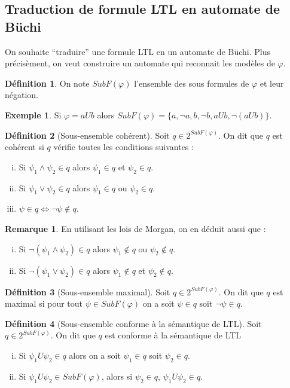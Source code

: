 \documentclass[12pt,a4paper]{article}
\theoremstyle{plain}
\theoremstyle{definition}
\newtheorem{defi}{Définition}
\newtheorem{rmq}{Remarque}
\newtheorem{ex}{Exemple}
\begin{document}
\subsection{Traduction de formule LTL en automate de Büchi}
On souhaite ``traduire'' une formule LTL en un automate de Büchi. Plus précisèment, on veut construire un automate qui reconnait les modèles de $\varphi$.

\begin{defi}
  On note $SubF(\varphi)$ l'ensemble des sous formules de $\varphi$ et leur négation.  
\end{defi}

\begin{ex}
  Si $\varphi = a U b$ alors $SubF(\varphi) = \{ a, \lnot a, b, \lnot b, a U b, \lnot(a U b)\}$.
\end{ex}

\begin{defi}[Sous-ensemble cohérent]
  Soit $q \in 2^{SubF(\varphi)}$. On dit que $q$ est cohérent si $q$ vérifie toutes les conditions suivantes :
  \begin{enumerate}[(i)]
  \item Si $\psi_1 \land \psi_2 \in q$ alors $\psi_1 \in q$ et $\psi_2 \in q$.
  \item Si $\psi_1 \lor \psi_2 \in q$ alors $\psi_1 \in q$ ou $\psi_2 \in q$.
  \item $\psi \in q \iff \lnot \psi \not\in q$.
  \end{enumerate}
\end{defi}

\begin{rmq}
  En utilisant les lois de Morgan, on en déduit aussi que :
  \begin{enumerate}[(i)]
  \item Si $\lnot (\psi_1 \land \psi_2) \in q$ alors $\psi_1 \not \in q$ ou $\psi_2 \not \in q$.
  \item Si $\lnot (\psi_1 \lor \psi_2) \in q$ alors $\psi_1 \not \in q$ et $\psi_2 \not \in q$.
  \end{enumerate}
\end{rmq}


\begin{defi}[Sous-ensemble maximal]
  Soit $q \in 2^{SubF(\varphi)}$. On dit que $q$ est maximal si pour tout $\psi \in SubF(\varphi)$ on a soit $\psi \in q$ soit $\lnot \psi \in q$.  
\end{defi}

\begin{defi}[Sous-ensemble conforme à la sémantique de LTL]
  Soit $q \in 2^{SubF(\varphi)}$. On dit que $q$ est conforme à la sémantique de LTL
  \begin{enumerate}[(i)]
  \item Si $\psi_1 U \psi_2 \in q$ alors on a soit $\psi_1 \in q$ soit $\psi_2 \in q$.
  \item Si $\psi_1 U \psi_2 \in SubF(\varphi)$, alors si $\psi_2 \in q$, $\psi_1 U \psi_2 \in q$.
  \end{enumerate}
\end{defi}
\end{document}
